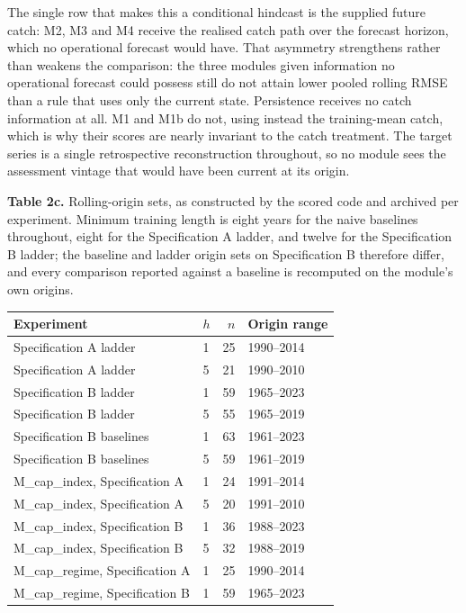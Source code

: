 \documentclass[11pt]{article}
\begin{document}
The single row that makes this a conditional hindcast is the supplied
future catch: M2, M3 and M4 receive the realised catch path over the
forecast horizon, which no operational forecast would have. That asymmetry
strengthens rather than weakens the comparison: the three modules given
information no operational forecast could possess still do not attain
lower pooled rolling RMSE than a rule that uses only the current state.
Persistence receives no catch information at all. M1 and M1b
do not, using instead the training-mean catch, which is why their scores
are nearly invariant to the catch treatment. The target series is a
single retrospective reconstruction throughout, so no module sees the
assessment vintage that would have been current at its origin.

\textbf{Table 2c.} Rolling-origin sets, as constructed by the scored
code and archived per experiment. Minimum training length is eight years
for the naive baselines throughout, eight for the Specification A
ladder, and twelve for the Specification B ladder; the baseline and
ladder origin sets on Specification B therefore differ, and every
comparison reported against a baseline is recomputed on the module's own
origins.

\begin{longtable}[]{@{}llrl@{}}
\toprule\noalign{}
Experiment & \(h\) & \(n\) & Origin range \\
\midrule\noalign{}
\endhead
\bottomrule\noalign{}
\endlastfoot
Specification A ladder & 1 & 25 & 1990--2014 \\
Specification A ladder & 5 & 21 & 1990--2010 \\
Specification B ladder & 1 & 59 & 1965--2023 \\
Specification B ladder & 5 & 55 & 1965--2019 \\
Specification B baselines & 1 & 63 & 1961--2023 \\
Specification B baselines & 5 & 59 & 1961--2019 \\
M\_cap\_index, Specification A & 1 & 24 & 1991--2014 \\
M\_cap\_index, Specification A & 5 & 20 & 1991--2010 \\
M\_cap\_index, Specification B & 1 & 36 & 1988--2023 \\
M\_cap\_index, Specification B & 5 & 32 & 1988--2019 \\
M\_cap\_regime, Specification A & 1 & 25 & 1990--2014 \\
M\_cap\_regime, Specification B & 1 & 59 & 1965--2023 \\
\end{longtable}
\end{document}
